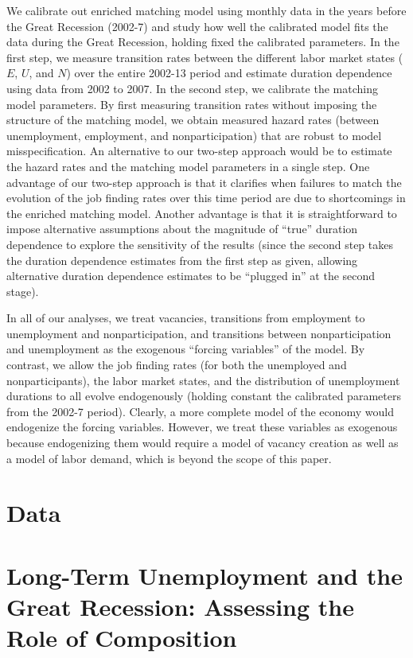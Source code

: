 \documentclass[12pt]{article}
\theoremstyle{definition}
\begin{document}
We calibrate out enriched matching model using monthly data in the years before the Great Recession (2002-7) and study how well the calibrated model fits the data during the Great Recession, holding fixed the calibrated parameters. In the first step, we measure transition rates between the different labor market states ($E$, $U$, and $N$) over the entire 2002-13 period and estimate duration dependence using data from 2002 to 2007. In the second step, we calibrate the matching model parameters. By first measuring transition rates without imposing the structure of the matching model, we obtain measured hazard rates (between unemployment, employment, and nonparticipation) that are robust to model misspecification. An alternative to our two-step approach would be to estimate the hazard rates and the matching model parameters in a single step. One advantage of our two-step approach is that it clarifies when failures to match the evolution of the job finding rates over this time period are due to shortcomings in the enriched matching model. Another advantage is that it is straightforward to impose alternative assumptions about the magnitude of ``true'' duration dependence to explore the sensitivity of the results (since the second step takes the duration dependence estimates from the first step as given, allowing alternative duration dependence estimates to be ``plugged in'' at the second stage).

In all of our analyses, we treat vacancies, transitions from employment to unemployment and nonparticipation, and transitions between nonparticipation and unemployment as the exogenous ``forcing variables'' of the model. By contrast, we allow the job finding rates (for both the unemployed and nonparticipants), the labor market states, and the distribution of unemployment durations to all evolve endogenously (holding constant the calibrated parameters from the 2002-7 period). Clearly, a more complete model of the economy would endogenize the forcing variables. However, we treat these variables as exogenous because endogenizing them would require a model of vacancy creation as well as a model of labor demand, which is beyond the scope of this paper.

\section{Data}

\section{Long-Term Unemployment and the Great Recession: Assessing the Role of Composition}
\end{document}
